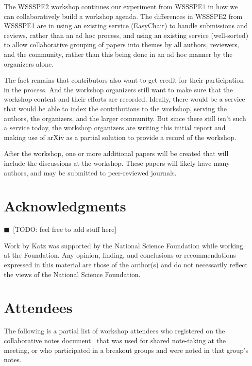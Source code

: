 \documentclass[11pt, oneside]{amsart}
\newcommand{\todo}[1]{{\color{blue}$\blacksquare$~\textsf{[TODO: #1]}}}
\begin{document}
The WSSSPE2 workshop continues our experiment from WSSSPE1 in how we can
collaboratively build a workshop agenda. The differences in WSSSPE2 from WSSSPE1
are in using an existing service (EasyChair) to handle submissions and reviews,
rather than an ad hoc process, and using an existing service (well-sorted) to
allow collaborative grouping of papers into themes by all authors, reviewers,
and the community, rather than this being done in an ad hoc manner by the
organizers alone.

The fact remains that contributors also want to get credit for their
participation in the process. And the workshop organizers still want to make
sure that the workshop content and their efforts are recorded. Ideally, there
would be a service that would be able to index the contributions to the
workshop, serving the authors, the organizers, and the larger community. But
since there still isn't such a service today, the workshop organizers are
writing this initial report and making use of arXiv as a partial solution to
provide a record of the workshop.

After the workshop, one or more additional papers will be created that will
include the discussions at the workshop. These papers will likely have many
authors, and may be submitted to peer-reviewed journals.

\section*{Acknowledgments} \label{sec:acks}
\todo{feel free to add stuff here}

Work by Katz was supported by the National
Science Foundation while working at the Foundation.  Any opinion, finding, and
conclusions or recommendations expressed in this material are those of the
author(s) and do not necessarily reflect the views of the National Science
Foundation.


\appendix
\section{Attendees}  \label{sec:attendees}
The following is a partial list of workshop attendees who registered on the
collaborative notes document~\cite{WSSSPE2-google-notes} that was used
for shared note-taking at the meeting, or who participated in a breakout groups
and were noted in that group's notes.
\end{document}
